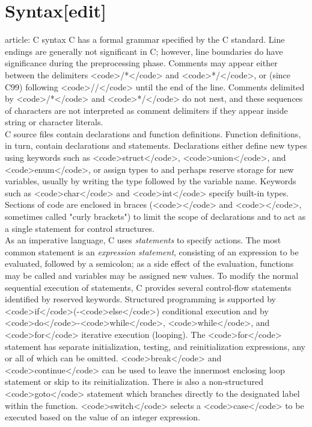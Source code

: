 \documentclass{article}\usepackage{titlesec}
\begin{document}
\section{Syntax[edit]}
\itemMain article: C syntax
C has a formal grammar specified by the C standard. Line endings are generally not significant in C; however, line boundaries do have significance during the preprocessing phase. Comments may appear either between the delimiters <code>/*</code> and <code>*/</code>, or (since C99)  following <code>//</code> until the end of the line. Comments delimited by <code>/*</code> and <code>*/</code> do not nest, and these sequences of characters are not interpreted as comment delimiters if they appear inside string or character literals.
\\
C source files contain declarations and function definitions. Function definitions, in turn, contain declarations and statements. Declarations either define new types using keywords such as <code>struct</code>, <code>union</code>, and <code>enum</code>, or assign types to and perhaps reserve storage for new variables, usually by writing the type followed by the variable name. Keywords such as <code>char</code> and <code>int</code> specify built-in types. Sections of code are enclosed in braces (<code>{</code> and <code>}</code>, sometimes called "curly brackets") to limit the scope of declarations and to act as a single statement for control structures.
\\
As an imperative language, C uses \emph{statements} to specify actions. The most common statement is an \emph{expression statement}, consisting of an expression to be evaluated, followed by a semicolon; as a side effect of the evaluation, functions may be called and variables may be assigned new values. To modify the normal sequential execution of statements, C provides several control-flow statements identified by reserved keywords. Structured programming is supported by <code>if</code>(-<code>else</code>) conditional execution and by <code>do</code>-<code>while</code>, <code>while</code>, and <code>for</code> iterative execution (looping). The <code>for</code> statement has separate initialization, testing, and reinitialization expressions, any or all of which can be omitted. <code>break</code> and <code>continue</code> can be used to leave the innermost enclosing loop statement or skip to its reinitialization. There is also a non-structured <code>goto</code> statement which branches directly to the designated label within the function. <code>switch</code> selects a <code>case</code> to be executed based on the value of an integer expression.
\end{document}
